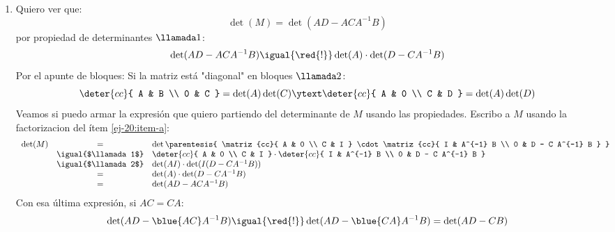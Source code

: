 \begin{enumerate}[label=(\alph*)]
  \item Quiero ver que:
        $$
          \det(M) = \det(A D - A C A^{-1} B)
        $$
        por propiedad de determinantes $\llamada1$:
        $$
          \det(A D - A C A^{-1} B)
          \igual{\red{!}}
          \det(A) \cdot \det(D - C A^{-1} B)
        $$
        Por el apunte de bloques:
        Si la matriz está "diagonal" en bloques $\llamada2$:
        $$
          \deter{cc}{
            A & B \\
            0 & C
          } = \det(A) \det(C)
          \ytext
          \deter{cc}{
            A & 0 \\
            C & D
          }
          = \det(A) \det(D)
        $$
        Veamos si puedo armar la expresión que quiero partiendo del determinante de $M$ usando las propiedades.
        Escribo a $M$ usando la factorizacion del ítem \ref{ej-20:item-a}:
        $$
          \begin{array}{rcl}
            \det(M) & =                   &
            \det
            \parentesis{
              \matriz{cc}{
            A       & 0                              \\
            C       & I
              }
              \cdot
              \matriz{cc}{
            I       & A^{-1} B                       \\
            0       & D - C A^{-1} B
              }
            }                                        \\
                    & \igual{$\llamada1$} &
            \deter{cc}{
            A       & 0                              \\
            C       & I
            }
            \cdot
            \deter{cc}{
            I       & A^{-1} B                       \\
            0       & D - C A^{-1} B
            }                                        \\
                    & \igual{$\llamada2$} &
            \det(A I) \cdot \det(I (D - C A^{-1} B)) \\
                    & =                   &
            \det(A) \cdot \det(D - C A^{-1} B)       \\
                    & =                   &
            \det(AD - A C A^{-1} B)                  \\
          \end{array}
        $$
        Con esa última expresión, si $AC = CA$:
        $$
          \det(AD - \blue{A C} A^{-1} B)
          \igual{\red{!}}
          \det(AD - \blue{C A} A^{-1} B) =
          \det(AD - CB)
        $$

\end{enumerate}

\begin{aportes}
  \item {}
  \item {}
\end{aportes}
